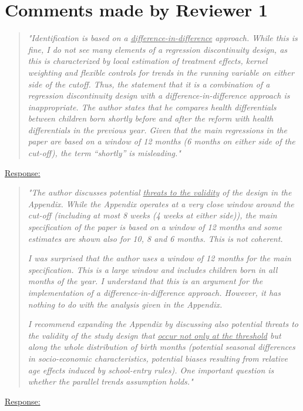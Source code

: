 
\clearpage
\section*{Comments made by Reviewer 1}


% 
\begin{quote}
	\textit{"Identification is based on a \underline{difference-in-difference} approach. While this is fine, I do not see many elements of a regression discontinuity design, as this is characterized by local estimation of treatment effects, kernel weighting and flexible controls for trends in the running variable on either side of the cutoff. Thus, the statement that it is a combination of a regression discontinuity design with a difference-in-difference approach is inappropriate. The author states that he compares health differentials between children born shortly before and after the reform with health differentials in the previous year. Given that the main regressions in the paper are based on a window of 12 months (6 months on either side of the cut-off), the term “shortly” is misleading."}
\end{quote}
\underline{Response:}

% 
\begin{quote}
	\textit{"The author discusses potential \underline{threats to the validity} of the design in the Appendix. While the Appendix operates at a very close window around the cut-off (including at most 8 weeks (4 weeks at either side)), the main specification of the paper is based on a window of 12 months	and some estimates are shown also for 10, 8 and 6 months. This is not coherent. }
			
	\textit{I was surprised that the author uses a window of 12 months for the main specification. This is a large window and includes children born in all months of the year. I understand that this is an argument for the implementation of a difference-in-difference approach. However, it has nothing to do with the analysis given in the Appendix.} 
	 		
	\textit{I recommend expanding the Appendix by discussing also potential threats to the validity of the study design that \underline{occur not only at the threshold} but along the whole distribution of birth months (potential seasonal differences in socio-economic characteristics, potential biases resulting from relative age effects induced by school-entry rules). One important question is whether the parallel trends assumption holds."}
\end{quote}
\underline{Response:}

